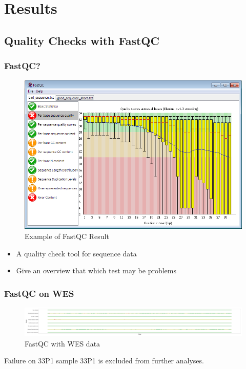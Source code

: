 \documentclass{beamer}
\begin{document}
    \section{Results}
    \subsection{Quality Checks with FastQC}
    \begin{frame}
        \frametitle{FastQC?}

        \begin{figure}
            \includegraphics[width=0.5 \linewidth]{figures/Workflow/FastQC.png}
            \caption{Example of FastQC Result \protect\cite{fastqc1}}
        \end{figure}

        \begin{itemize}
            \item A quality check tool for sequence data
            \item Give an overview that which test may be problems
        \end{itemize}
    \end{frame}

    \begin{frame}
        \frametitle{FastQC on WES}

        \begin{figure}
            \includegraphics[width=\linewidth]{figures/FastQC/FastQC_WES.pdf}
            \caption{FastQC with WES data}
        \end{figure}

        \begin{alertblock}{Failure on 33P1 sample}
            33P1 is excluded from further analyses.
        \end{alertblock}
    \end{frame}
\end{document}
